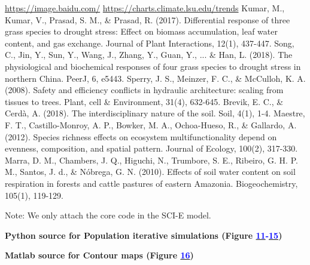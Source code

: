 \documentclass{mcmthesis}
\begin{document}
\newpage
\begin{thebibliography}{99}

 \url{https://image.baidu.com/}
 \url{https://charts.climate.lsu.edu/trends}
 Kumar, M., Kumar, V., Prasad, S. M., \& Prasad, R. (2017). Differential response of three grass species to drought stress: Effect on biomass accumulation, leaf water content, and gas exchange. Journal of Plant Interactions, 12(1), 437-447.
 Song, C., Jin, Y., Sun, Y., Wang, J., Zhang, Y., Guan, Y., ... \& Han, L. (2018). The physiological and biochemical responses of four grass species to drought stress in northern China. PeerJ, 6, e5443.
 Sperry, J. S., Meinzer, F. C., \& McCulloh, K. A. (2008). Safety and efficiency conflicts in hydraulic architecture: scaling from tissues to trees. Plant, cell \& Environment, 31(4), 632-645.
 Brevik, E. C., \& Cerdà, A. (2018). The interdisciplinary nature of the soil. Soil, 4(1), 1-4.
 Maestre, F. T., Castillo-Monroy, A. P., Bowker, M. A., Ochoa-Hueso, R., \& Gallardo, A. (2012). Species richness effects on ecosystem multifunctionality depend on evenness, composition, and spatial pattern. Journal of Ecology, 100(2), 317-330.
  Marra, D. M., Chambers, J. Q., Higuchi, N., Trumbore, S. E., Ribeiro, G. H. P. M., Santos, J. d., \& Nóbrega, G. N. (2010). Effects of soil water content on soil respiration in forests and cattle pastures of eastern Amazonia. Biogeochemistry, 105(1), 119-129.

\end{thebibliography}

\newpage

\begin{appendices}
Note: We only attach the core code in the SCI-E model.

\noindent \textbf{\textcolor[rgb]{0.353,0.753,0.612}{Python source for Population iterative simulations (Figure \hyperref[fig:5_2_85]{\textcolor{blue}{11}}\textcolor{blue}{-}\hyperref[fig:3_2_85]{\textcolor{blue}{15}})}}

\textbf{\textcolor[rgb]{0.353,0.753,0.612}{Matlab source for Contour maps (Figure \hyperref[fig:Contours]{\textcolor{blue}{16}}) }}


\end{appendices}
\end{document}

